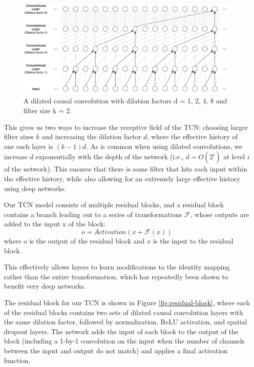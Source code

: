\documentclass[12pt,a4paper,titlepage,openany]{report}
\begin{document}
\begin{figure}[H]
    \centering
    \includegraphics[width=1\linewidth]{images/Chapter3_Methodology/dilation factor.png}
    \caption{A dilated causal convolution with dilation factors d = 1, 2, 4, 8 and filter size k = 2.}
    \label{fig:dilation-factor}
\end{figure}

This gives us two ways to increase the receptive field of the TCN: choosing larger filter sizes \(k\) and increasing the dilation factor \(d\), where the effective history of one such layer is \((k - 1)d\). As is common when using dilated convolutions, we increase \(d\) exponentially with the depth of the network (i.e., \(d = O(2^i)\) at level \(i\) of the network). This ensures that there is some filter that hits each input within the effective history, while also allowing for an extremely large effective history using deep networks.

Our TCN model consists of multiple residual blocks, and a residual block contains a branch leading out to a series of transformations \(\mathcal{F}\), whose outputs are added to the input x of the block:
\begin{equation}
    o = Activation(x + \mathcal{F}(x))
    \label{eq:activation}
\end{equation}
where \(o\) is the output of the residual block and \(x\) is the input to the residual block.

This effectively allows layers to learn modifications to the identity mapping rather than the entire transformation, which has repeatedly been shown to benefit very deep networks.

The residual block for our TCN is shown in Figure \ref{fig:residual-block}, where each of the residual blocks contains two sets of dilated causal convolution layers with the same dilation factor, followed by normalization, ReLU activation, and spatial dropout layers. The network adds the input of each block to the output of the block (including a 1-by-1 convolution on the input when the number of channels between the input and output do not match) and applies a final activation function. 
\end{document}
